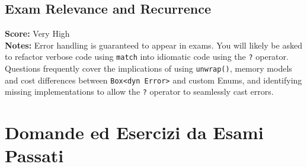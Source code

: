 \subsection*{Exam Relevance and Recurrence}
\textbf{Score:} Very High \\
\textbf{Notes:} Error handling is guaranteed to appear in exams. You will likely be asked to refactor verbose code using \texttt{match} into idiomatic code using the \texttt{?} operator. Questions frequently cover the implications of using \texttt{unwrap()}, memory models and cost differences between \texttt{Box<dyn Error>} and custom Enums, and identifying missing implementations to allow the \texttt{?} operator to seamlessly cast errors.

\section{Domande ed Esercizi da Esami Passati}

